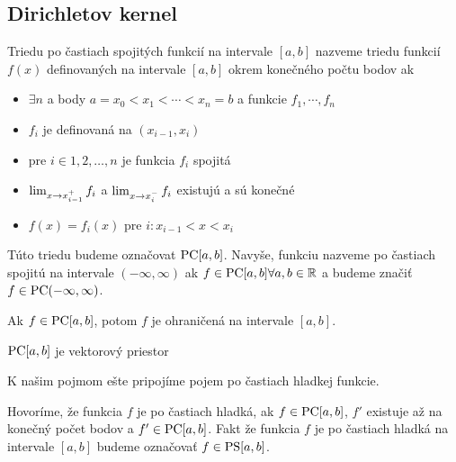 
\subsection{Dirichletov kernel}
\begin{definicia}
    Triedu po častiach spojitých funkcií na intervale $[a,b]$ nazveme
    triedu funkcií $f(x)$ definovaných na intervale $[a,b]$ okrem
    konečného počtu bodov ak
    \begin{itemize}
        \item
            $\exists n$ a body $a=x_0<x_1<\cdots<x_n=b$ a funkcie
            $f_1, \cdots, f_n$
        \item
            $f_i$ je definovaná na $(x_{i-1},x_i)$
        \item
            pre $i \in 1,2,\dots,n$ je funkcia $f_i$ spojitá
        \item
            $\lim_{x \rightarrow x_{i-1}^+} f_i$ a 
            $\lim_{x \rightarrow x_i^-} f_i$ existujú a sú konečné
        \item
            $f(x) = f_i(x)$ pre $i: x_{i-1} < x < x_i$
    \end{itemize}
    Túto triedu budeme označovat $\mbox{PC}[a,b]$. Navyše, funkciu nazveme po
    častiach spojitú na intervale $(-\infty,\infty)$ ak $f\in \mbox{PC}[a,b]
    \forall a,b \in {\mathbb R}$ a budeme značiť $f\in\mbox{PC}(-\infty,\infty)$.
\end{definicia}

\begin{lema}
    Ak $f \in \mbox{PC}[a,b]$, potom $f$ je ohraničená na intervale $[a,b]$.
    \label{lema:ohranicenost_na_pcab}
\end{lema}

\begin{lema}
    $\mbox{PC}[a,b]$ je vektorový priestor
\end{lema}
K našim pojmom ešte pripojíme pojem po častiach hladkej funkcie.
\begin{definicia}
    Hovoríme, že funkcia $f$ je po častiach hladká, ak
    $f \in \mbox{PC}[a,b]$, $f'$ existuje až na konečný počet bodov
    a $f'\in \mbox{PC}[a,b]$. Fakt že funkcia $f$ je po častiach hladká na
    intervale $[a,b]$ budeme označovať $f\in\mbox{PS}[a,b]$.
\end{definicia}

